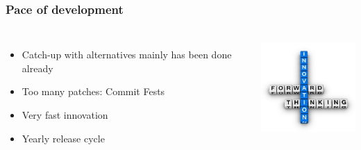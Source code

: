 \documentclass{beamer}
\begin{document}
\begin{frame}[fragile]
  \frametitle{Pace of development}

  \vfill

\begin{columns}[c]

  \begin{itemize}
  \item Catch-up with alternatives mainly has been done already
  \item Too many patches: Commit Fests
  \item Very fast innovation
  \item Yearly release cycle
  \end{itemize}

\begin{center}
  \includegraphics[height=10em]{innovation.jpg}
\end{center}
\end{columns}
\end{frame}
\end{document}
